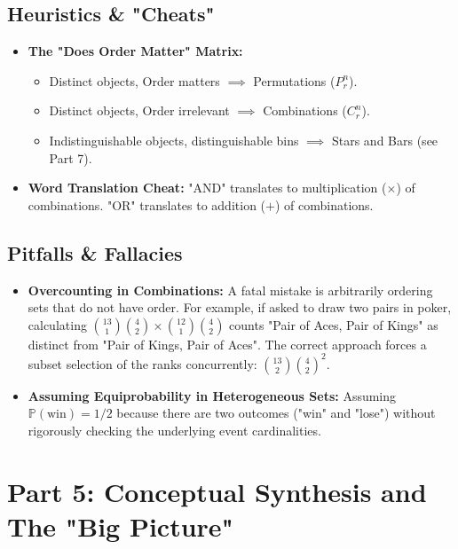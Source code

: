 \documentclass[11pt]{article}
\theoremstyle{definition}
\theoremstyle{plain}
\theoremstyle{remark}
\newcommand{\Prob}{\mathbb{P}}
\begin{document}
\subsection{Heuristics \& "Cheats"}
\begin{itemize}
    \item \textbf{The "Does Order Matter" Matrix:} 
    \begin{itemize}
        \item Distinct objects, Order matters $\implies$ Permutations ($P^n_r$).
        \item Distinct objects, Order irrelevant $\implies$ Combinations ($C^n_r$).
        \item Indistinguishable objects, distinguishable bins $\implies$ Stars and Bars (see Part 7).
    \end{itemize}
    \item \textbf{Word Translation Cheat:} "AND" translates to multiplication ($\times$) of combinations. "OR" translates to addition ($+$) of combinations.
\end{itemize}

\subsection{Pitfalls \& Fallacies}
\begin{itemize}
    \item \textbf{Overcounting in Combinations:} A fatal mistake is arbitrarily ordering sets that do not have order. For example, if asked to draw two pairs in poker, calculating $\binom{13}{1}\binom{4}{2} \times \binom{12}{1}\binom{4}{2}$ counts "Pair of Aces, Pair of Kings" as distinct from "Pair of Kings, Pair of Aces". The correct approach forces a subset selection of the ranks concurrently: $\binom{13}{2} \binom{4}{2}^2$.
    \item \textbf{Assuming Equiprobability in Heterogeneous Sets:} Assuming $\Prob(\text{win}) = 1/2$ because there are two outcomes ("win" and "lose") without rigorously checking the underlying event cardinalities.
\end{itemize}

\newpage
\section{Part 5: Conceptual Synthesis and The "Big Picture"}
\end{document}
